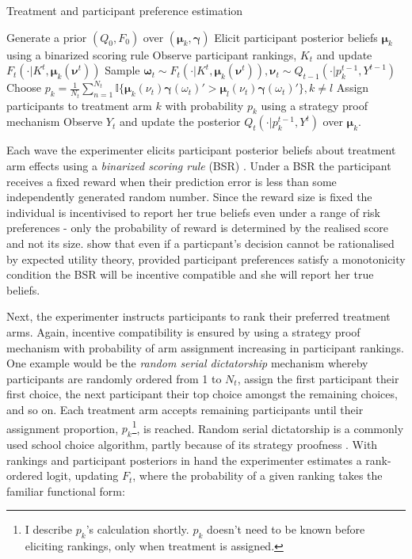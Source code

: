 \documentclass[twoside,11pt]{article}
\begin{document}
\begin{algorithm}
  \caption{Treatment and participant preference estimation }\label{alg:cap}
  \begin{algorithmic}
  \State Generate a prior $(Q_0, F_0)$ over $\left(\bm{\mu}_k, \bm{\gamma}\right)$
  \State Elicit participant posterior beliefs $\bm{\mu}_k$ using a binarized scoring rule
  \State Observe participant rankings, $K_t$ and update $F_{t}( \cdot | K^{t}, \bm{\mu}_k(\bm{\nu}^{t}))$ 
  \State Sample $\bm{\omega}_{t} \sim F_{t}( \cdot | K^{t}, \bm{\mu}_k(\bm{\nu}^{t})), \bm{\nu}_t \sim Q_{t-1}(\cdot | p_{k}^{t-1}, Y^{t-1})$ 
  \State Choose $p_k = \frac{1}{N_t} 
  \sum^{N_t}_{n=1} \mathbb{I}\{\bm{\mu}_k(\nu_{t}) \bm{\gamma}(\omega_{t})' > \bm{\mu}_l(\nu_{t}) \bm{\gamma}(\omega_{t})'\}, k \neq l$ 
  \State Assign participants to treatment arm $k$ with probability $p_{k}$ using a strategy proof mechanism 
  \State Observe $Y_t$ and update the posterior $Q_{t}(\cdot | p_k^{t-1}, Y^{t})$ over $\bm{\mu}_k$. 
  \EndFor
  \end{algorithmic}
  \end{algorithm}

Each wave the experimenter elicits participant posterior beliefs about treatment 
arm effects using a \textit{binarized scoring rule} (BSR) \citep{hossain}. Under a BSR the participant 
receives a fixed reward when their prediction error is less than some independently 
generated random number. Since the reward size is fixed the individual is 
incentivised to report her true beliefs even under a range of risk preferences - only the 
probability of reward is determined by the realised score and not its size. \cite{hossain} 
show that even if a particpant's decision cannot be rationalised by expected 
utility theory, provided participant preferences satisfy a monotonicity condition 
the BSR will be incentive compatible and she will report her true beliefs.

Next, the experimenter instructs participants to rank their preferred treatment 
arms. Again, incentive compatibility is ensured by using a strategy proof mechanism
with probability of arm assignment increasing in participant rankings. One example 
would be the \textit{random serial dictatorship} mechanism whereby participants 
are randomly ordered from 1 to $N_t$, assign the first participant their first choice,
the next participant their top choice amongst the remaining choices, and so on. 
Each treatment arm accepts remaining participants until their assignment proportion, 
$p_k$\footnote{I describe $p_k$'s calculation shortly. $p_k$ doesn't need to be known 
before eliciting rankings, only when treatment is assigned.}, is reached. Random 
serial dictatorship is a commonly used school choice algorithm, partly because of 
its strategy proofness \citep{abdulkadirolu2003a}.  With rankings 
and participant posteriors in hand the experimenter estimates a rank-ordered logit, 
updating $F_t$, 
where the probability of a given ranking takes the familiar functional form:
\end{document}
